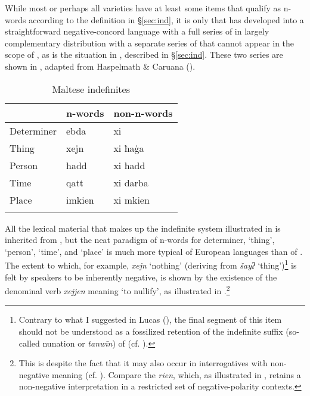 \documentclass[output=paper]{langsci/langscibook}
\begin{document}
While most or perhaps all  varieties have at least some items that qualify as n-words according to the definition in §\ref{sec:ind}, it is only  that has developed into a straightforward negative-concord language with a full series of   in largely complementary distribution with a separate series of  that cannot appear in the scope of , as is the situation in , described in §\ref{sec:ind}. These two series are shown in , adapted from Haspelmath \& Caruana (\citeyear[215]{HaspelmathCaruana1996}).

\begin{table}
\begin{tabularx}{.6\textwidth}{XXX}
\lsptoprule
& n-words & non-n-words\\
\midrule
Determiner & ebda & xi\\
Thing & xejn & xi ħa\.ga\\
Person & ħadd & xi ħadd\\
Time & qatt & xi darba\\
Place & imkien & xi mkien\\
\lspbottomrule
\end{tabularx}
\caption{Maltese indefinites}
\label{tab:negation:malteseindefinites}
\end{table}


All the lexical material that makes up the  indefinite system illustrated in  is inherited from , but the neat paradigm of n-words for determiner, ‘thing’, ‘person’, ‘time’, and ‘place’ is much more typical of European  languages than of . The extent to which, for example, \textit{xejn} ‘nothing’ (deriving from \textit{šayʔ} ‘thing’)\footnote{Contrary to what I suggested in Lucas (\citeyear[83--84]{Lucas2009}), the final segment of this item should not be understood as a fossilized retention of the indefinite suffix (so-called nunation or \textit{tanwīn}) of   (cf. \citealt{LucasSpagnol2019}).} is felt by  speakers to be inherently negative, is shown by the existence of the denominal verb \textit{xejjen} meaning ‘to nullify’, as illustrated in .\footnote{This is despite the fact that it may also occur in interrogatives with non-negative meaning (cf. \citealt{CamilleriSadler2017}). Compare the   \textit{rien}, which, as illustrated in , retains a non-negative interpretation in a restricted set of negative-polarity contexts.}
\end{document}
